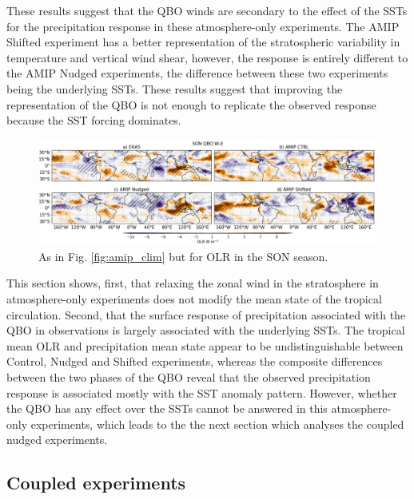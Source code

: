 These results suggest that the QBO winds are secondary to the effect of the SSTs for the precipitation response in these atmosphere-only experiments. The AMIP Shifted experiment has a better representation of the stratospheric variability in temperature and vertical wind shear, however, the response is entirely different to the AMIP Nudged experiments, the difference between these two experiments being the underlying SSTs. These results suggest that improving the representation of the QBO is not enough to replicate the observed response because the SST forcing dominates. 

\begin{figure}[t!]
\centering
 \includegraphics[width=\linewidth]{figures/olr_amip_sonqbowqboe.png}
\caption[SON OLR response in atmosphere-only experiments]{As in Fig. \ref{fig:amip_clim} but for OLR in the SON season. }
\label{fig:amip_son_olr}
\end{figure}

This section shows, first, that relaxing the zonal wind in the stratosphere in atmosphere-only experiments does not modify the mean state of the tropical circulation. Second, that the surface response of precipitation associated with the QBO in observations is largely associated with the underlying SSTs. The tropical mean OLR and precipitation mean state appear to be undistinguishable between Control, Nudged and Shifted experiments, whereas the composite differences between the two phases of the QBO reveal that the observed precipitation response is associated mostly with the SST anomaly pattern. However, whether the QBO has any effect over the SSTs cannot be answered in this atmosphere-only experiments, which leads to the the next section which analyses the coupled nudged experiments. 

\subsection{Coupled experiments}

